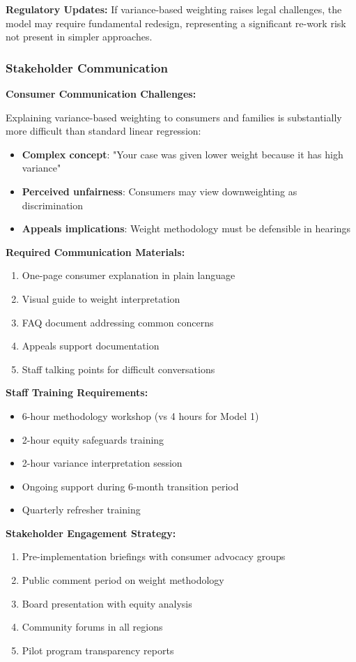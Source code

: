 \textbf{Regulatory Updates:} If variance-based weighting raises legal challenges, the model may require fundamental redesign, representing a significant re-work risk not present in simpler approaches.

\subsubsection{Stakeholder Communication}

\textbf{Consumer Communication Challenges:}

Explaining variance-based weighting to consumers and families is substantially more difficult than standard linear regression:
\begin{itemize}
    \item \textbf{Complex concept}: "Your case was given lower weight because it has high variance"
    \item \textbf{Perceived unfairness}: Consumers may view downweighting as discrimination
    \item \textbf{Appeals implications}: Weight methodology must be defensible in hearings
\end{itemize}

\textbf{Required Communication Materials:}
\begin{enumerate}
    \item One-page consumer explanation in plain language
    \item Visual guide to weight interpretation
    \item FAQ document addressing common concerns
    \item Appeals support documentation
    \item Staff talking points for difficult conversations
\end{enumerate}

\textbf{Staff Training Requirements:}
\begin{itemize}
    \item 6-hour methodology workshop (vs 4 hours for Model 1)
    \item 2-hour equity safeguards training
    \item 2-hour variance interpretation session
    \item Ongoing support during 6-month transition period
    \item Quarterly refresher training
\end{itemize}

\textbf{Stakeholder Engagement Strategy:}
\begin{enumerate}
    \item Pre-implementation briefings with consumer advocacy groups
    \item Public comment period on weight methodology
    \item Board presentation with equity analysis
    \item Community forums in all regions
    \item Pilot program transparency reports
\end{enumerate}

